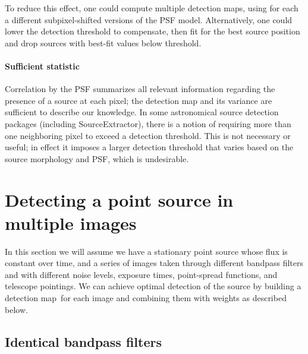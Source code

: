 \documentclass[letterpaper,preprint]{aastex62}
\newcommand{\detmap}{detection map}
\begin{document}
To reduce this effect, one could compute multiple detection maps,
using for each a different subpixel-shifted versions of the PSF model.
Alternatively, one could lower the detection threshold to compensate,
then fit for the best source position and drop sources with best-fit
values below threshold.


\paragraph{Sufficient statistic}  Correlation by the PSF summarizes
all relevant information regarding the presence of a source at each
pixel; the detection map and its variance are sufficient to describe
our knowledge.  In some astronomical source detection packages
(including SourceExtractor), there is a notion of requiring more than
one neighboring pixel to exceed a detection threshold.  This is not
necessary or useful; in effect it imposes a larger detection threshold
that varies based on the source morphology and PSF, which is
undesirable.









\section{Detecting a point source in multiple images}

In this section we will assume we have a stationary point source whose
flux is constant over time, and a series of images taken through
different bandpass filters and with different noise levels, exposure
times, point-spread functions, and telescope pointings.  We can
achieve optimal detection of the source by building a \detmap\ for
each image and combining them with weights as described below.



\subsection{Identical bandpass filters}
\end{document}
